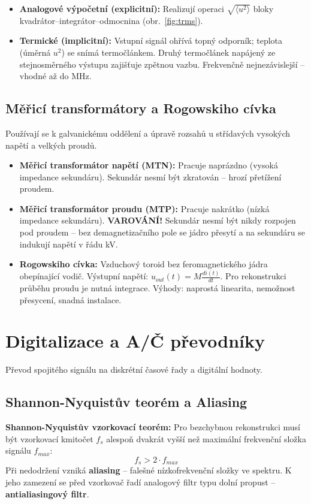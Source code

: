 \begin{itemize}
    \item \textbf{Analogové výpočetní (explicitní):} Realizují operaci $\sqrt{\langle u^2 \rangle}$ bloky kvadrátor--integrátor--odmocnina (obr.~\ref{fig:trms}).
    \item \textbf{Termické (implicitní):} Vstupní signál ohřívá topný odporník; teplota (úměrná $u^2$) se snímá termočlánkem. Druhý termočlánek napájený ze stejnosměrného výstupu zajišťuje zpětnou vazbu. Frekvenčně nejnezávislejší -- vhodné až do MHz.
\end{itemize}

\subsection{Měřicí transformátory a Rogowskiho cívka}
Používají se k galvanickému oddělení a úpravě rozsahů u střídavých vysokých napětí a velkých proudů.
\begin{itemize}
    \item \textbf{Měřicí transformátor napětí (MTN):} Pracuje naprázdno (vysoká impedance sekundáru). Sekundár nesmí být zkratován -- hrozí přetížení proudem.
    \item \textbf{Měřicí transformátor proudu (MTP):} Pracuje nakrátko (nízká impedance sekundáru). \textbf{VAROVÁNÍ!} Sekundár nesmí být nikdy rozpojen pod proudem -- bez demagnetizačního pole se jádro přesytí a na sekundáru se indukují napětí v řádu kV.
    \item \textbf{Rogowskiho cívka:} Vzduchový toroid bez feromagnetického jádra obepínající vodič. Výstupní napětí: $u_{out}(t) = M \frac{di(t)}{dt}$. Pro rekonstrukci průběhu proudu je nutná integrace. Výhody: naprostá linearita, nemožnost přesycení, snadná instalace.
\end{itemize}

\section{Digitalizace a A/Č převodníky}
Převod spojitého signálu na diskrétní časové řady a digitální hodnoty.

\subsection{Shannon-Nyquistův teorém a Aliasing}
\noindent\textbf{Shannon-Nyquistův vzorkovací teorém:} Pro bezchybnou rekonstrukci musí být vzorkovací kmitočet $f_s$ alespoň dvakrát vyšší než maximální frekvenční složka signálu $f_{max}$:
\[ f_s > 2 \cdot f_{max} \]
Při nedodržení vzniká \textbf{aliasing} -- falešné nízkofrekvenční složky ve spektru. K jeho zamezení se před vzorkovač řadí analogový filtr typu dolní propust -- \textbf{antialiasingový filtr}.

